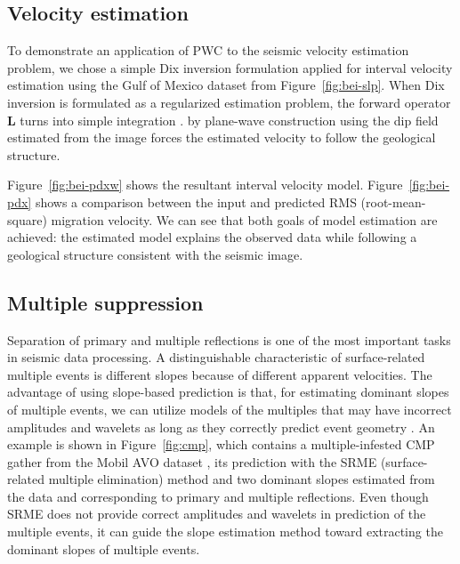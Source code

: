 \subsection{Velocity estimation}


To demonstrate an application of PWC to the seismic velocity
estimation problem, we chose a simple Dix inversion formulation
\cite[]{GEO20-01-00680086} applied for interval velocity estimation
using the Gulf of Mexico dataset from Figure~\ref{fig:bei-slp}. When
Dix inversion is formulated as a regularized estimation problem, the
forward operator $\mathbf{L}$  turns into simple integration
\cite[]{Clapp.sep.97.bob1,alejandro}. 
 by plane-wave construction using the dip field
estimated from the image forces the estimated velocity to follow the
geological structure.

Figure~\ref{fig:bei-pdxw} shows the resultant interval velocity model.
Figure~\ref{fig:bei-pdx} shows a comparison between the input and
predicted RMS (root-mean-square) migration velocity.  We can see that
both goals of model estimation are achieved: the estimated model
explains the observed data while following a geological structure
consistent with the seismic image.

\subsection{Multiple suppression}

Separation of primary and multiple reflections is one of the most
important tasks in seismic data processing. A distinguishable
characteristic of surface-related multiple events is different slopes
because of different apparent velocities. The advantage of using
slope-based prediction is that, for estimating dominant slopes of
multiple events, we can utilize models of the multiples that may have
incorrect amplitudes and wavelets as long as they correctly predict
event geometry \cite[]{antoine}. An example is shown in
Figure~\ref{fig:cmp}, which contains a multiple-infested CMP gather
from the Mobil AVO dataset \cite[]{CSI00-00-00010213}, its prediction
with the SRME (surface-related multiple elimination) method
\cite[]{GEO57-09-11661177} and two dominant slopes estimated from the
data and corresponding to primary and multiple reflections. Even
though SRME does not provide correct amplitudes and wavelets in
prediction of the multiple events, it can guide the slope estimation
method toward extracting the dominant slopes of multiple events.


